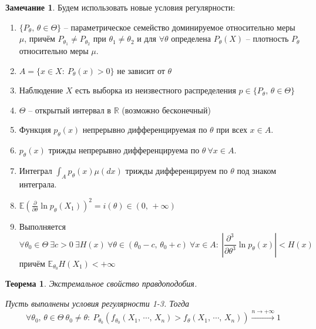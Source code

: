 \documentclass[a4paper,12pt]{article}
\theoremstyle{plain}
\newtheorem{theorem}{Теорема}[section]
\theoremstyle{definition}
\newtheorem*{note}{Замечание}
\theoremstyle{remark}
\begin{document}
\begin{note}
  Будем использовать новые условия регулярности:
  \begin{enumerate}
    \item $\{P_\theta,\, \theta \in \Theta\}$ -- параметрическое семейство доминируемое относительно меры $\mu$, причём $P_{\theta_1} \neq P_{\theta_2}$ при $\theta_1 \neq \theta_2$ и для $\forall \theta$ определена $P_\theta(X)$ -- плотность $P_\theta$ относительно меры $\mu$.
    \item $A = \{x \in X :\: P_\theta(x) > 0\}$ не зависит от $\theta$
    \item Наблюдение $X$ есть выборка из неизвестного распределения $p \in \{P_\theta,\, \theta \in \Theta\}$
    \item $\Theta$ -- открытый интервал в $\mathbb{R}$ (возможно бесконечный)
    \item Функция $p_\theta(x)$ непрерывно дифференцируемая по $\theta$ при всех $x \in A$.
    \item $p_\theta(x)$ трижды непрерывно дифференцируема по $\theta \: \forall x \in A$.
    \item Интеграл $\int_Ap_\theta(x)\mu(dx)$ трижды дифференцируем по $\theta$ под знаком интеграла.
    \item $\mathbb{E}(\frac{\partial}{\partial\theta}\ln p_\theta(X_1))^2 = i(\theta) \in (0,\,+\infty)$
    \item Выполняется
    \[
      \forall  \theta_0 \in \Theta \: \exists c > 0 \: \exists H(x) \: \forall \theta \in (\theta_0 - c,\, \theta_0 + c) \: \forall x \in A :\: \left\vert\frac{\partial^3}{\partial\theta^3}\ln p_\theta(x)\right\vert < H(x)
    \]
    причём $\mathbb{E}_{\theta_0}H(X_1) < +\infty$
  \end{enumerate}
\end{note}

\begin{theorem}
  Экстремальное свойство правдоподобия.
  
  Пусть выполнены условия регулярности 1-3. Тогда
  \[
    \forall \theta_0,\,\theta \in \Theta \: \theta_0 \neq \theta :\: P_{\theta_0}(f_{\theta_0}(X_1,\,\cdots,\,X_n) > f_\theta(X_1,\,\cdots,\,X_n)) \overset{n \to +\infty}{\to} 1
  \]
\end{theorem}
\end{document}
